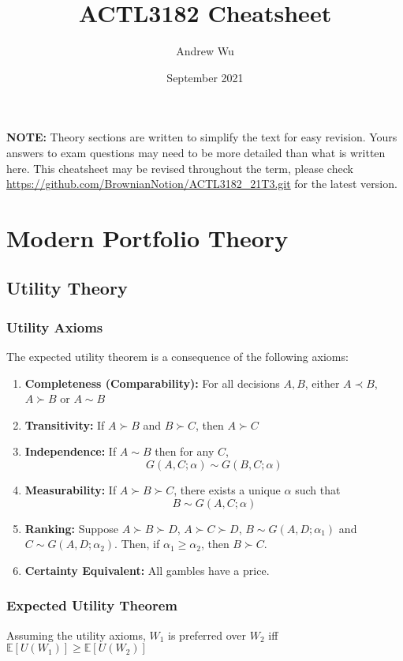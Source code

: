 \documentclass[11pt]{article}
\title{\textbf{ACTL3182 Cheatsheet}}
\author{Andrew Wu}
\date{September 2021}
\newcommand{\E}{\mathbb{E}}
\begin{document}
	\maketitle
	\textbf{NOTE:} Theory sections are written to simplify the text for easy revision. Yours answers to exam questions may need to be more detailed than what is written here. This cheatsheet may be revised throughout the term, please check \url{https://github.com/BrownianNotion/ACTL3182_21T3.git} for the latest version.
	\section{Modern Portfolio Theory}
	\subsection{Utility Theory}
	\subsubsection{Utility Axioms}
	The expected utility theorem is a consequence of the following axioms:
	\begin{enumerate}
		\item \textbf{Completeness (Comparability):} For all decisions \( A,B \), either \( A \prec B \), \( A\succ B \) or \( A\sim B \)
		\item \textbf{Transitivity:} If \( A\succ B \) and \( B\succ C \), then \( A\succ C \)
		\item \textbf{Independence:} If \( A\sim B \) then for any \( C \), 
		\[	G(A,C;\alpha) \sim G(B, C; \alpha)\]
		\item \textbf{Measurability:} If \( A\succ B\succ C \), there exists a unique \( \alpha \) such that
		\[ B\sim G(A, C;\alpha)	\]
		\item \textbf{Ranking:} Suppose \( A\succ B\succ D \), \( A\succ C\succ D \), \( B\sim G(A, D;\alpha_1) \) and \( C\sim G(A, D; \alpha_2) \). Then, if \( \alpha_1\geq\alpha_2 \), then \( B\succ C \).
		\item \textbf{Certainty Equivalent:} All gambles have a price.
	\end{enumerate}

	\subsubsection{Expected Utility Theorem}
	Assuming the utility axioms, \( W_1 \) is preferred over \( W_2 \) iff \( \E[U(W_1)] \geq \E[U(W_2)] \)
	
\end{document}
